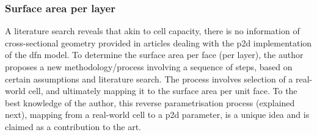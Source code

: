 \subsubsection*{Surface area per layer}\label{sec:surfareaperlayer}

A literature search reveals that akin  to cell capacity, there is no information
of  cross-sectional geometry  provided in  articles dealing  with the  \gls{p2d}
implementation of  the \gls{dfn} model. To  determine the surface area  per face
(per layer), the author proposes  a new methodology/process involving a sequence
of  steps, based  on  certain  assumptions and  literature  search. The  process
involves  selection of  a  real-world cell,  and ultimately  mapping  it to  the
surface area per  unit face. To the  best knowledge of the  author, this reverse
parametrisation process  (explained next), mapping  from a real-world cell  to a
\gls{p2d} parameter, is  a unique idea and  is claimed as a  contribution to the
art.

